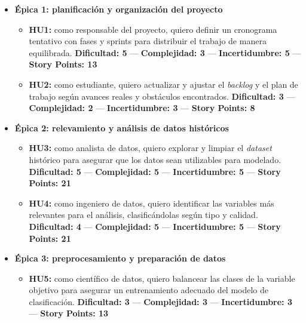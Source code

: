 \documentclass[
11pt, %
]{charter}
\begin{document}
\begin{itemize}
  \item \textbf{Épica 1: planificación y organización del proyecto}
    \begin{itemize}
      \item \textbf{HU1:} como responsable del proyecto, quiero definir un cronograma tentativo con fases y sprints para distribuir el trabajo de manera equilibrada.  
      \newline \textbf{Dificultad: 5} — \textbf{Complejidad: 3} — \textbf{Incertidumbre: 5} — \textbf{Story Points: 13}

      \item \textbf{HU2:} como estudiante, quiero actualizar y ajustar el \textit{backlog} y el plan de trabajo según avances reales y obstáculos encontrados.  
      \newline \textbf{Dificultad: 3} — \textbf{Complejidad: 2} — \textbf{Incertidumbre: 3} — \textbf{Story Points: 8}
    \end{itemize}

  \item \textbf{Épica 2: relevamiento y análisis de datos históricos}
    \begin{itemize}
      \item \textbf{HU3:} como analista de datos, quiero explorar y limpiar el \textit{dataset} histórico para asegurar que los datos sean utilizables para modelado.  
      \newline \textbf{Dificultad: 5} — \textbf{Complejidad: 5} — \textbf{Incertidumbre: 5} — \textbf{Story Points: 21}
      
      \item \textbf{HU4:} como ingeniero de datos, quiero identificar las variables más relevantes para el análisis, clasificándolas según tipo y calidad.  
      \newline \textbf{Dificultad: 4} — \textbf{Complejidad: 5} — \textbf{Incertidumbre: 5} — \textbf{Story Points: 21}
    \end{itemize}

  \item \textbf{Épica 3: preprocesamiento y preparación de datos}
    \begin{itemize}
      \item \textbf{HU5:} como científico de datos, quiero balancear las clases de la variable objetivo para asegurar un entrenamiento adecuado del modelo de clasificación.  
      \newline \textbf{Dificultad: 3} — \textbf{Complejidad: 3} — \textbf{Incertidumbre: 3} — \textbf{Story Points: 13}


\end{itemize}
\end{itemize}
\end{document}
